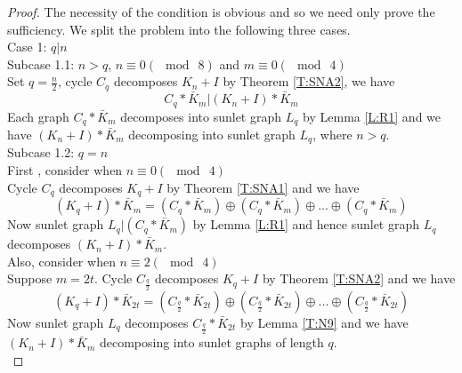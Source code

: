\documentclass[12pt]{report}
\begin{document}
\begin{proof}
The necessity of the condition is obvious and so we need only prove the sufficiency. We split the problem into the following three cases.\\
Case 1: $q|n$\\
Subcase 1.1: $n>q$, $n\equiv 0(\mod\ 8)$ and $m\equiv 0(\mod\ 4)$\\
Set $q=\frac{n}{2}$, cycle $C_q$ decomposes $K_n+I$ by Theorem
\ref{T:SNA2}, we have
$$C_q*\bar{K}_m|(K_n+I)*\bar{K}_m$$
Each graph $C_q*\bar{K}_m$ decomposes into sunlet graph $L_q$ by
Lemma \ref{L:R1} and we have $(K_n+I)*\bar{K}_m$ decomposing
into sunlet graph $L_q$, where $n>q$.\\
Subcase 1.2: $q=n$\\
First , consider when $n\equiv 0(\mod\ 4)$\\
 Cycle $C_q$ decomposes
$K_q+I$ by Theorem \ref{T:SNA1} and we have
$$(K_q+I)*\bar{K}_m=(C_q*\bar{K}_m)\oplus (C_q*\bar{K}_m)\oplus. . .\oplus (C_q*\bar{K}_m)$$
Now sunlet graph $L_q|(C_q*\bar{K}_m)$ by Lemma \ref{L:R1} and hence sunlet graph $L_q$ decomposes $(K_n+I)*\bar{K}_m$.\\
Also, consider when $n\equiv 2(\mod\ 4)$\\
Suppose $m=2t$. Cycle $C_{\frac{q}{2}}$ decomposes $K_q+I$ by
Theorem \ref{T:SNA2} and we have
$$(K_q+I)*\bar{K}_{2t}=(C_{\frac{q}{2}}*\bar{K}_{2t})\oplus
(C_{\frac{q}{2}}*\bar{K}_{2t})\oplus. . .\oplus
(C_{\frac{q}{2}}*\bar{K}_{2t})$$
Now sunlet graph $L_q$ decomposes $C_{\frac{q}{2}}*\bar{K}_{2t}$ by Lemma \ref{T:N9} and  we have $(K_n+I)*\bar{K}_m$ decomposing into sunlet graphs of length $q$.\\


\end{proof}
\end{document}
